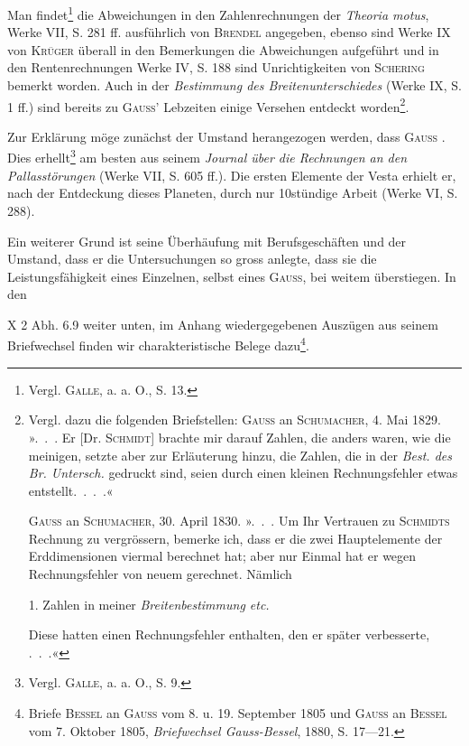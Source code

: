 Man findet\footnote{Vergl. \textsc{Galle}, a. a. O., S. 13.} die Abweichungen in den Zahlenrechnungen der \textit{Theoria motus},
Werke VII, S. 281 ff. ausführlich von \textsc{Brendel} angegeben, ebenso sind Werke
IX von \textsc{Krüger} überall in den Bemerkungen die Abweichungen aufgeführt
und in den Rentenrechnungen Werke IV, S. 188 sind Unrichtigkeiten von
\textsc{Schering} bemerkt worden. Auch in der \textit{Bestimmung des Breitenunterschiedes}
(Werke IX, S. 1 ff.) sind bereits zu \textsc{Gauss}’ Lebzeiten einige Versehen entdeckt
worden\footnote{Vergl. dazu die folgenden Briefstellen: \textsc{Gauss} an \textsc{Schumacher}, 4. Mai 1829. ».\ .\ . Er [Dr. \textsc{Schmidt}]
brachte mir darauf Zahlen, die anders waren, wie die meinigen, setzte aber zur Erläuterung hinzu, die
Zahlen, die in der \textit{Best. des Br. Untersch.} gedruckt sind, seien durch einen kleinen Rechnungsfehler etwas
entstellt.\ .\ .\ .«
\par\hspace*{1em}\textsc{Gauss} an \textsc{Schumacher}, 30. April 1830. ».\ .\ . Um Ihr Vertrauen zu \textsc{Schmidts} Rechnung zu vergrössern, bemerke ich, dass er die zwei Hauptelemente der Erddimensionen viermal berechnet hat; aber nur
Einmal hat er wegen Rechnungsfehler von neuem gerechnet. Nämlich
\par\hspace*{2em}1. Zahlen in meiner \textit{Breitenbestimmung etc.}
\par\hspace*{3em}Diese hatten einen Rechnungsfehler enthalten, den er später verbesserte, .\ .\ .«}.

Zur Erklärung möge zunächst der Umstand herangezogen werden, dass
\textsc{Gauss} . Dies erhellt\footnote{Vergl. \textsc{Galle}, a. a. O., S. 9.} am besten aus seinem
\textit{Journal über die Rechnungen an den Pallasstörungen} (Werke VII, S. 605 ff.). Die
ersten Elemente der Vesta erhielt er, nach der Entdeckung dieses Planeten,
durch nur 10stündige Arbeit (Werke VI, S. 288).

Ein weiterer Grund ist seine Überhäufung mit Berufsgeschäften und der
Umstand, dass er die Untersuchungen so gross anlegte, dass sie die Leistungsfähigkeit eines Einzelnen, selbst eines \textsc{Gauss}, bei weitem überstiegen. In den
\par\noindent X 2 Abh. 6.\hfill 9
\clearpage{}
\setcounter{footnote}{0}
\noindent weiter unten, im Anhang wiedergegebenen Auszügen aus seinem Briefwechsel
finden wir charakteristische Belege dazu\footnote{Briefe \textsc{Bessel} an \textsc{Gauss} vom 8. u. 19. September 1805 und \textsc{Gauss} an \textsc{Bessel} vom 7. Oktober 1805,
\textit{Briefwechsel Gauss-Bessel}, 1880, S. 17—21.}.


